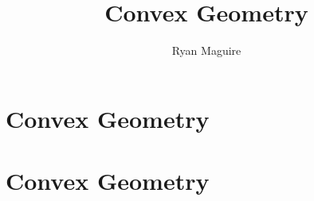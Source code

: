\documentclass[crop=false,class=book,oneside]{standalone}
\begin{document}
    \ifx\ifmathcourses\undefined
        \title{Convex Geometry}
        \author{Ryan Maguire}
        \date{\vspace{-5ex}}
        \maketitle
        \tableofcontents
        \clearpage
        \chapter{Convex Geometry}
        \setcounter{chapter}{1}
    \else
        \chapter{Convex Geometry}
    \fi
\end{document}
